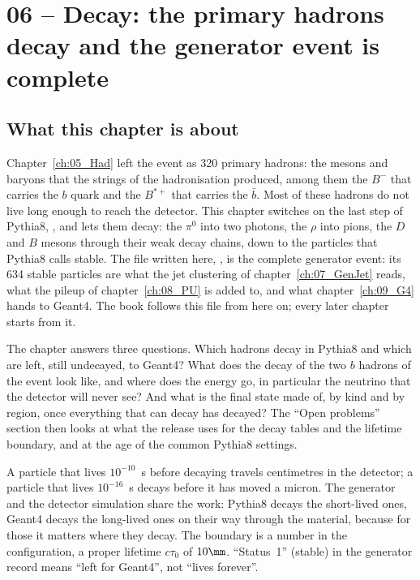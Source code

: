 \chapter{06 -- Decay: the primary hadrons decay and the generator event is complete}
\label{ch:06_Decay}

\section{What this chapter is about}
Chapter~\ref{ch:05_Had} left the event as 320 primary hadrons: the mesons and baryons that the strings of
the hadronisation produced, among them the $B^-$ that carries the $b$ quark and the $B^{*+}$ that carries the
$\bar{b}$. Most of these hadrons do not live long enough to reach the detector. This chapter switches on the
last step of Pythia8, , and lets them decay: the $\pi^0$ into two photons, the
$\rho$ into pions, the $D$ and $B$ mesons through their weak decay chains, down to the particles that Pythia8
calls stable. The file written here, , is the complete
generator event: its 634 stable particles are what the jet clustering of chapter~\ref{ch:07_GenJet} reads, what
the pileup of chapter~\ref{ch:08_PU} is added to, and what chapter~\ref{ch:09_G4} hands to Geant4. The book
follows this file from here on; every later chapter starts from it.

The chapter answers three questions. Which hadrons decay in Pythia8 and which are left, still undecayed, to
Geant4? What does the decay of the two $b$ hadrons of the event look like, and where does the energy go,
in particular the neutrino that the detector will never see? And what is the final state made of, by kind and
by region, once everything that can decay has decayed? The ``Open problems'' section then looks at what the
release uses for the decay tables and the lifetime boundary, and at the age of the common Pythia8 settings.

\begin{plainwords}
A particle that lives $10^{-10}$~s before decaying travels centimetres in the detector; a particle that lives
$10^{-16}$~s decays before it has moved a micron. The generator and the detector simulation share the work: Pythia8
decays the short-lived ones, Geant4 decays the long-lived ones on their way through the material, because
for those it matters where they decay. The boundary is a number in the configuration, a proper lifetime
$c\tau_0$ of $10\mm$. ``Status~1'' (stable) in the generator record means ``left for Geant4'', not
``lives forever''.
\end{plainwords}

